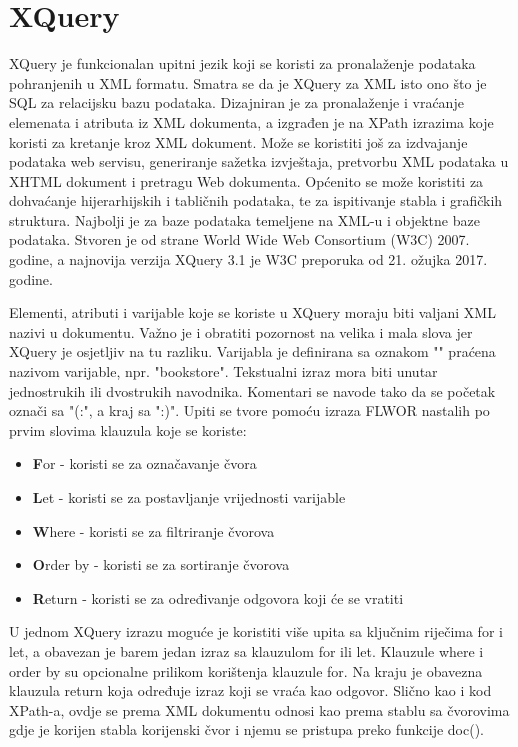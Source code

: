 \documentclass{foi}
\begin{document}
\section{XQuery}

XQuery je funkcionalan upitni jezik koji se koristi za pronalaženje podataka pohranjenih u XML formatu. Smatra se da je XQuery za XML isto ono što je SQL za relacijsku bazu podataka. Dizajniran je za pronalaženje i vraćanje elemenata i atributa iz XML dokumenta, a izgrađen je na XPath izrazima koje koristi za kretanje kroz XML dokument. Može se koristiti još za izdvajanje podataka web servisu, generiranje sažetka izvještaja, pretvorbu XML podataka u XHTML dokument i pretragu Web dokumenta. Općenito se može koristiti za dohvaćanje hijerarhijskih i tabličnih podataka, te za ispitivanje stabla i grafičkih struktura. Najbolji je za baze podataka temeljene na XML-u i objektne baze podataka. Stvoren je od strane World Wide Web Consortium (W3C) 2007. godine, a najnovija verzija XQuery 3.1 je W3C preporuka od 21. ožujka 2017. godine.

Elementi, atributi i varijable koje se koriste u XQuery moraju biti valjani XML nazivi u dokumentu. Važno je i obratiti pozornost na velika i mala slova jer XQuery je osjetljiv na tu razliku. Varijabla je definirana sa oznakom "\textdollar " praćena nazivom varijable, npr. "\textdollar bookstore". Tekstualni izraz mora biti unutar jednostrukih ili dvostrukih navodnika. Komentari se navode tako da se početak označi sa "(:", a kraj sa ":)". Upiti se tvore pomoću izraza FLWOR nastalih po prvim slovima klauzula koje se koriste:

\begin{itemize}
\item \textbf{F}or - koristi se za označavanje čvora
\item \textbf{L}et - koristi se za postavljanje vrijednosti varijable
\item \textbf{W}here - koristi se za filtriranje čvorova
\item \textbf{O}rder by - koristi se za sortiranje čvorova
\item \textbf{R}eturn - koristi se za određivanje odgovora koji će se vratiti
\end{itemize}

U jednom XQuery izrazu moguće je koristiti više upita sa ključnim riječima for i let, a obavezan je barem jedan izraz sa klauzulom for ili let. Klauzule where i order by su opcionalne prilikom korištenja klauzule for. Na kraju je obavezna klauzula return koja određuje izraz koji se vraća kao odgovor. Slično kao i kod XPath-a, ovdje se prema XML dokumentu odnosi kao prema stablu sa čvorovima gdje je korijen stabla korijenski čvor i njemu se pristupa preko funkcije doc().
\end{document}
